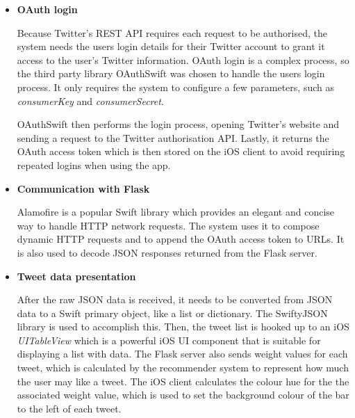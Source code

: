 \documentclass{article}
\begin{document}
\begin{itemize}
    \item \textbf{OAuth login}

    Because Twitter's REST API requires each request to be authorised, the system needs the users login details for their Twitter account to grant it access to the user's Twitter information. OAuth login is a complex process, so the third party library OAuthSwift \cite{oauthswift} was chosen to handle the users login process. It only requires the system to configure a few parameters, such as \textit{consumerKey} and \textit{consumerSecret}. 
    
    OAuthSwift then performs the login process, opening Twitter's website and sending a request to the Twitter authorisation API.
    Lastly, it returns the OAuth access token which is then stored on the iOS client to avoid requiring repeated logins when using the app.
 
    \item \textbf{Communication with Flask}

    Alamofire \cite{alamofire} is a popular Swift library which provides an elegant and concise way to handle HTTP network requests. The system uses it to compose dynamic HTTP requests and to append the OAuth access token to URLs. It is also used to decode JSON responses returned from the Flask server.

    \item \textbf{Tweet data presentation}
 
    After the raw JSON data is received, it needs to be converted from JSON data to a Swift primary object, like a list or dictionary. The SwiftyJSON \cite{swiftyjson} library is used to accomplish this. Then, the tweet list is hooked up to an iOS \textit{UITableView} which is a powerful iOS UI component that is suitable for displaying a list with data. The Flask server also sends weight values for each tweet, which is calculated by the recommender system to represent how much the user may like a tweet. The iOS client calculates the colour hue for the the associated weight value, which is used to set the background colour of the bar to the left of each tweet.
\end{itemize}


\newpage
\end{document}
